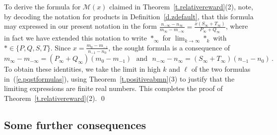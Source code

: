 \documentclass[letterpaper,11pt,oneside,reqno]{amsbook}
\numberwithin{figure}{chapter}
\theoremstyle{definition}
\theoremstyle{definition}
\theoremstyle{definition}
\theoremstyle{definition}
\theoremstyle{definition}
\newcommand{\minamm}{\mathcal{M}}
\begin{document}
To derive the formula for $\minamm(x)$ claimed in Theorem~\ref{t.relativereward}(2), note, by decoding the notation for products in Definition~\ref{d.zdefault}, that
this formula may expressed in our present notation in the form $\tfrac{n_{-\infty} - n_\infty}{m_\infty - m_{-\infty}} = \tfrac{x(S_\infty +T_\infty)}{P_\infty + Q_\infty}$,
where in fact we have extended this notation to write $*_\infty$ for $\lim_{k \to \infty}*_k$ with $* \in \{P,Q,S,T\}$. Since  $x = \tfrac{m_0 - m_{-1}}{n_{-1} - n_0}$,
the sought formula is a consequence of 
$$
 m_\infty - m_{-\infty} = (P_\infty + Q_\infty) (m_0 - m_{-1}) \, \, \, \, \textrm{and} \, \, \, \, n_{-\infty} -n_\infty = (S_\infty + T_\infty) (n_{-1} - n_0) \, .
$$
To obtain these identities, we take the limit in high $k$ and $\ell$ of the two formulas in~(\ref{e.pqstformulas}), using Theorem~\ref{t.positiveabmn}(3) to justify that the limiting expressions are finite real numbers. This completes the proof of Theorem~\ref{t.relativereward}(2). \qed
 
 \subsection{Some further consequences}
\end{document}
